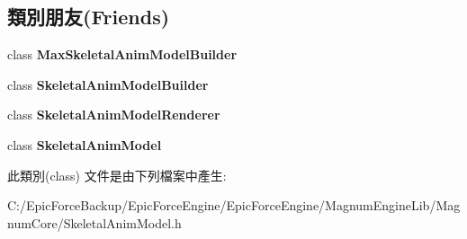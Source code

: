 \subsection*{類別朋友(Friends)}
\begin{DoxyCompactItemize}
\item 
class {\bfseries Max\+Skeletal\+Anim\+Model\+Builder}\hypertarget{class_magnum_1_1endif_1_1_bone_a68b08defd5651552ef2b6f922eee7ff9}{}\label{class_magnum_1_1endif_1_1_bone_a68b08defd5651552ef2b6f922eee7ff9}

\item 
class {\bfseries Skeletal\+Anim\+Model\+Builder}\hypertarget{class_magnum_1_1endif_1_1_bone_a31d58261bc4fbf7a6c1d2d2547437974}{}\label{class_magnum_1_1endif_1_1_bone_a31d58261bc4fbf7a6c1d2d2547437974}

\item 
class {\bfseries Skeletal\+Anim\+Model\+Renderer}\hypertarget{class_magnum_1_1endif_1_1_bone_ae50fe2cd824b9de98af4dd4aa51d4935}{}\label{class_magnum_1_1endif_1_1_bone_ae50fe2cd824b9de98af4dd4aa51d4935}

\item 
class {\bfseries Skeletal\+Anim\+Model}\hypertarget{class_magnum_1_1endif_1_1_bone_a88c72f2f6b125ba518843b71080035e5}{}\label{class_magnum_1_1endif_1_1_bone_a88c72f2f6b125ba518843b71080035e5}

\end{DoxyCompactItemize}


此類別(class) 文件是由下列檔案中產生\+:\begin{DoxyCompactItemize}
\item 
C\+:/\+Epic\+Force\+Backup/\+Epic\+Force\+Engine/\+Epic\+Force\+Engine/\+Magnum\+Engine\+Lib/\+Magnum\+Core/Skeletal\+Anim\+Model.\+h\end{DoxyCompactItemize}
